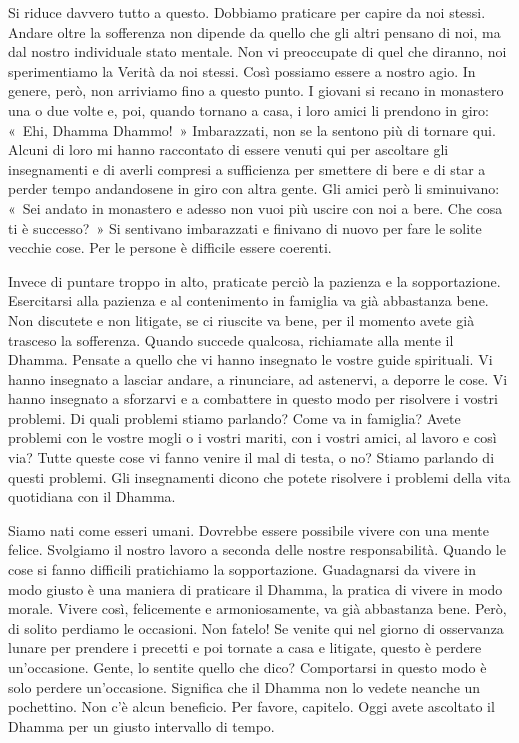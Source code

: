 Si riduce davvero tutto a questo. Dobbiamo praticare per capire da noi
stessi. Andare oltre la sofferenza non dipende da quello che gli altri
pensano di noi, ma dal nostro individuale stato mentale. Non vi
preoccupate di quel che diranno, noi sperimentiamo la Verità da noi
stessi. Così possiamo essere a nostro agio. In genere, però, non
arriviamo fino a questo punto. I giovani si recano in monastero una o
due volte e, poi, quando tornano a casa, i loro amici li prendono in
giro: «~Ehi, Dhamma Dhammo!~» Imbarazzati, non se la sentono più di
tornare qui. Alcuni di loro mi hanno raccontato di essere venuti qui per
ascoltare gli insegnamenti e di averli compresi a sufficienza per
smettere di bere e di star a perder tempo andandosene in giro con altra
gente. Gli amici però li sminuivano: «~Sei andato in monastero e adesso
non vuoi più uscire con noi a bere. Che cosa ti è successo?~» Si
sentivano imbarazzati e finivano di nuovo per fare le solite vecchie
cose. Per le persone è difficile essere coerenti.

Invece di puntare troppo in alto, praticate perciò la pazienza e la
sopportazione. Esercitarsi alla pazienza e al contenimento in famiglia
va già abbastanza bene. Non discutete e non litigate, se ci riuscite va
bene, per il momento avete già trasceso la sofferenza. Quando succede
qualcosa, richiamate alla mente il Dhamma. Pensate a quello che vi hanno
insegnato le vostre guide spirituali. Vi hanno insegnato a lasciar
andare, a rinunciare, ad astenervi, a deporre le cose. Vi hanno
insegnato a sforzarvi e a combattere in questo modo per risolvere i
vostri problemi. Di quali problemi stiamo parlando? Come va in famiglia?
Avete problemi con le vostre mogli o i vostri mariti, con i vostri
amici, al lavoro e così via? Tutte queste cose vi fanno venire il mal di
testa, o no? Stiamo parlando di questi problemi. Gli insegnamenti dicono
che potete risolvere i problemi della vita quotidiana con il Dhamma.

Siamo nati come esseri umani. Dovrebbe essere possibile vivere con una
mente felice. Svolgiamo il nostro lavoro a seconda delle nostre
responsabilità. Quando le cose si fanno difficili pratichiamo la
sopportazione. Guadagnarsi da vivere in modo giusto è una maniera di
praticare il Dhamma, la pratica di vivere in modo morale. Vivere così,
felicemente e armoniosamente, va già abbastanza bene. Però, di solito
perdiamo le occasioni. Non fatelo! Se venite qui nel giorno di
osservanza lunare per prendere i precetti e poi tornate a casa e
litigate, questo è perdere un'occasione. Gente, lo sentite quello che
dico? Comportarsi in questo modo è solo perdere un'occasione. Significa
che il Dhamma non lo vedete neanche un pochettino. Non c'è alcun
beneficio. Per favore, capitelo. Oggi avete ascoltato il Dhamma per un
giusto intervallo di tempo.

